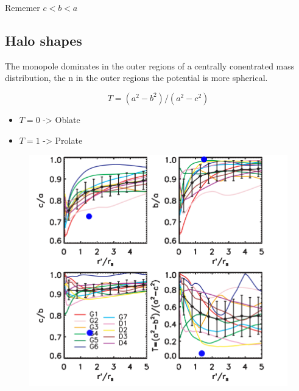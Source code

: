 Rememer $c<b<a$

\subsection{Halo shapes}

The monopole dominates in the outer regions of a centrally conentrated mass distribution, the n in the outer
regions the potential is more spherical. 

\begin{equation}
T = (a^2 - b^2)/(a^2-c^2)
\end{equation}

\begin{itemize}
\item $T=0$ -> Oblate
\item $T=1$ -> Prolate 
\end{itemize}


\begin{figure}[H]
\centering
\includegraphics[scale=0.5]{hayashimod.png}
\end{figure}

